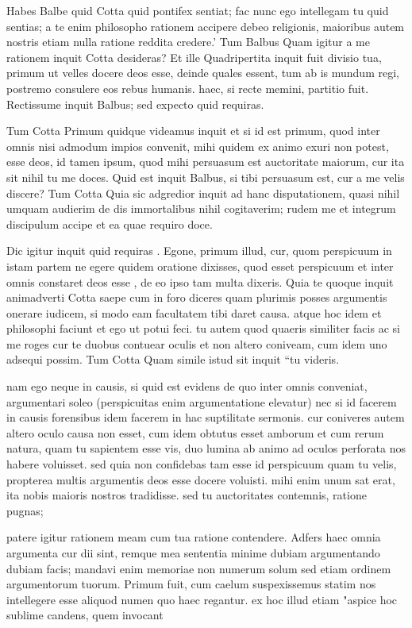  Habes Balbe quid Cotta quid pontifex sentiat; fac nunc ego intellegam tu quid sentias; a te enim philosopho rationem accipere debeo religionis, maioribus autem nostris etiam nulla ratione reddita credere.' Tum Balbus Quam igitur a me rationem inquit Cotta desideras? Et ille Quadripertita inquit fuit divisio tua, primum ut velles docere deos esse, deinde quales essent, tum ab is mundum regi, postremo consulere eos rebus humanis. haec, si recte memini, partitio fuit. Rectissume inquit Balbus; sed expecto quid requiras.

 Tum Cotta Primum quidque videamus inquit et si id est primum, quod inter omnis nisi admodum impios convenit, mihi quidem ex animo exuri non potest, esse deos, id tamen ipsum, quod mihi persuasum est auctoritate maiorum, cur ita sit nihil tu me doces. Quid est inquit Balbus, si tibi persuasum est, cur a me velis discere? Tum Cotta Quia sic adgredior inquit ad hanc disputationem, quasi nihil umquam audierim de dis immortalibus nihil cogitaverim; rudem me et integrum discipulum accipe et ea quae requiro doce.

 Dic igitur inquit quid requiras . Egone, primum illud, cur, quom perspicuum in istam partem ne egere quidem oratione dixisses, quod esset perspicuum et inter omnis constaret deos esse , de eo ipso tam multa dixeris. Quia te quoque inquit animadverti Cotta saepe cum in foro diceres quam plurimis posses argumentis onerare iudicem, si modo eam facultatem tibi daret causa. atque hoc idem et philosophi faciunt et ego ut potui feci. tu autem quod quaeris similiter facis ac si me roges cur te duobus contuear oculis et non altero coniveam, cum idem uno adsequi possim. Tum Cotta Quam simile istud sit inquit ``tu videris.

 nam ego neque in causis, si quid est evidens de quo inter omnis conveniat, argumentari soleo (perspicuitas enim argumentatione elevatur) nec si id facerem in causis forensibus idem facerem in hac suptilitate sermonis. cur coniveres autem altero oculo causa non esset, cum idem obtutus esset amborum et cum rerum natura, quam tu sapientem esse vis, duo lumina ab animo ad oculos perforata nos habere voluisset. sed quia non confidebas tam esse id perspicuum quam tu velis, propterea multis argumentis deos esse docere voluisti. mihi enim unum sat erat, ita nobis maioris nostros tradidisse. sed tu auctoritates contemnis, ratione pugnas;

 patere igitur rationem meam cum tua ratione contendere. Adfers haec omnia argumenta cur dii sint, remque mea sententia minime dubiam argumentando dubiam facis; mandavi enim memoriae non numerum solum sed etiam ordinem argumentorum tuorum. Primum fuit, cum caelum suspexissemus statim nos intellegere esse aliquod numen quo haec regantur. ex hoc illud etiam "aspice hoc sublime candens, quem invocant

